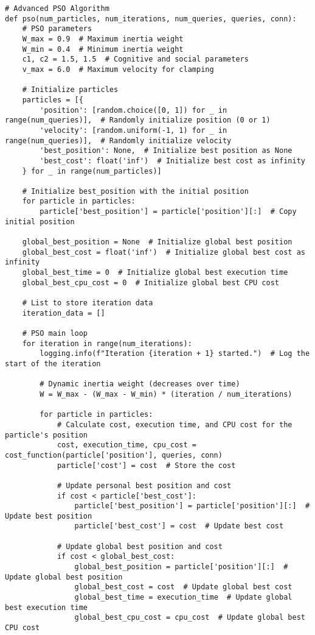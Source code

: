 \begin{lstlisting}[style=pythonstyle, caption={Python script to automate optimal view.}, label={lst:fullCode}]
# Advanced PSO Algorithm
def pso(num_particles, num_iterations, num_queries, queries, conn):
    # PSO parameters
    W_max = 0.9  # Maximum inertia weight
    W_min = 0.4  # Minimum inertia weight
    c1, c2 = 1.5, 1.5  # Cognitive and social parameters
    v_max = 6.0  # Maximum velocity for clamping

    # Initialize particles
    particles = [{
        'position': [random.choice([0, 1]) for _ in range(num_queries)],  # Randomly initialize position (0 or 1)
        'velocity': [random.uniform(-1, 1) for _ in range(num_queries)],  # Randomly initialize velocity
        'best_position': None,  # Initialize best position as None
        'best_cost': float('inf')  # Initialize best cost as infinity
    } for _ in range(num_particles)]

    # Initialize best_position with the initial position
    for particle in particles:
        particle['best_position'] = particle['position'][:]  # Copy initial position

    global_best_position = None  # Initialize global best position
    global_best_cost = float('inf')  # Initialize global best cost as infinity
    global_best_time = 0  # Initialize global best execution time
    global_best_cpu_cost = 0  # Initialize global best CPU cost

    # List to store iteration data
    iteration_data = []

    # PSO main loop
    for iteration in range(num_iterations):
        logging.info(f"Iteration {iteration + 1} started.")  # Log the start of the iteration

        # Dynamic inertia weight (decreases over time)
        W = W_max - (W_max - W_min) * (iteration / num_iterations)

        for particle in particles:
            # Calculate cost, execution time, and CPU cost for the particle's position
            cost, execution_time, cpu_cost = cost_function(particle['position'], queries, conn)
            particle['cost'] = cost  # Store the cost

            # Update personal best position and cost
            if cost < particle['best_cost']:
                particle['best_position'] = particle['position'][:]  # Update best position
                particle['best_cost'] = cost  # Update best cost

            # Update global best position and cost
            if cost < global_best_cost:
                global_best_position = particle['position'][:]  # Update global best position
                global_best_cost = cost  # Update global best cost
                global_best_time = execution_time  # Update global best execution time
                global_best_cpu_cost = cpu_cost  # Update global best CPU cost


\end{lstlisting}
